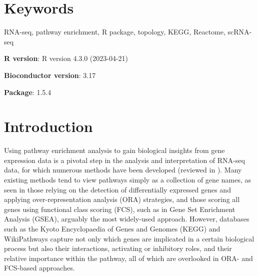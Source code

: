\documentclass[9pt,a4paper,]{extarticle}
\begin{document}
\section*{Keywords}
RNA-seq, pathway enrichment, R package, topology, KEGG, Reactome, scRNA-seq


\clearpage
\pagestyle{main}

\textbf{R version}: R version 4.3.0 (2023-04-21)

\textbf{Bioconductor version}: 3.17

\textbf{Package}: 1.5.4

\hypertarget{introduction}{%
\section{Introduction}\label{introduction}}

Using pathway enrichment analysis to gain biological insights from gene expression data is a pivotal step in the analysis and interpretation of RNA-seq data, for which numerous methods have been developed (reviewed in \citep{Maleki2020-ur, Mubeen2022-eq}).
Many existing methods tend to view pathways simply as a collection of gene names, as seen in those relying on the detection of differentially expressed genes and applying over-representation analysis (ORA) strategies, and those scoring all genes using functional class scoring (FCS), such as in Gene Set Enrichment Analysis (GSEA)\citep{Subramanian2005-lx}, arguably the most widely-used approach.
However, databases such as the Kyoto Encyclopaedia of Genes and Genomes (KEGG)\citep{OgataKEGGKyotoEncyclopediaa} and WikiPathways\citep{Martens2021} capture not only which genes are implicated in a certain biological process but also their interactions, activating or inhibitory roles, and their relative importance within the pathway, all of which are overlooked in ORA- and FCS-based approaches.
\end{document}

